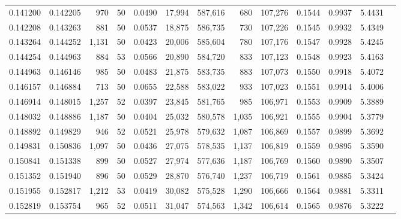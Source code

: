 \begin{tabular}{rrrrrrrrrrrrr}
0.141200 & 0.142205 &   970 &  50 &                                     0.0490 &  17,994 & 587,616 &     680 & 107,276 & 0.1544 & 0.9937 & 5.4431 \\
0.142208 & 0.143263 &   881 &  50 &                                     0.0537 &  18,875 & 586,735 &     730 & 107,226 & 0.1545 & 0.9932 & 5.4349 \\
0.143264 & 0.144252 & 1,131 &  50 &                                     0.0423 &  20,006 & 585,604 &     780 & 107,176 & 0.1547 & 0.9928 & 5.4245 \\
0.144254 & 0.144963 &   884 &  53 &                                     0.0566 &  20,890 & 584,720 &     833 & 107,123 & 0.1548 & 0.9923 & 5.4163 \\
0.144963 & 0.146146 &   985 &  50 &                                     0.0483 &  21,875 & 583,735 &     883 & 107,073 & 0.1550 & 0.9918 & 5.4072 \\
0.146157 & 0.146884 &   713 &  50 &                                     0.0655 &  22,588 & 583,022 &     933 & 107,023 & 0.1551 & 0.9914 & 5.4006 \\
0.146914 & 0.148015 & 1,257 &  52 &                                     0.0397 &  23,845 & 581,765 &     985 & 106,971 & 0.1553 & 0.9909 & 5.3889 \\
0.148032 & 0.148886 & 1,187 &  50 &                                     0.0404 &  25,032 & 580,578 &   1,035 & 106,921 & 0.1555 & 0.9904 & 5.3779 \\
0.148892 & 0.149829 &   946 &  52 &                                     0.0521 &  25,978 & 579,632 &   1,087 & 106,869 & 0.1557 & 0.9899 & 5.3692 \\
0.149831 & 0.150836 & 1,097 &  50 &                                     0.0436 &  27,075 & 578,535 &   1,137 & 106,819 & 0.1559 & 0.9895 & 5.3590 \\
0.150841 & 0.151338 &   899 &  50 &                                     0.0527 &  27,974 & 577,636 &   1,187 & 106,769 & 0.1560 & 0.9890 & 5.3507 \\
0.151352 & 0.151940 &   896 &  50 &                                     0.0529 &  28,870 & 576,740 &   1,237 & 106,719 & 0.1561 & 0.9885 & 5.3424 \\
0.151955 & 0.152817 & 1,212 &  53 &                                     0.0419 &  30,082 & 575,528 &   1,290 & 106,666 & 0.1564 & 0.9881 & 5.3311 \\
0.152819 & 0.153754 &   965 &  52 &                                     0.0511 &  31,047 & 574,563 &   1,342 & 106,614 & 0.1565 & 0.9876 & 5.3222 \\

\end{tabular}
